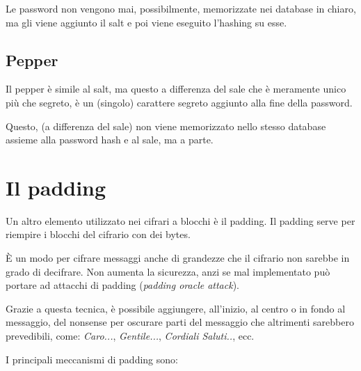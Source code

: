 \textsf{\small Le password non vengono mai, possibilmente, memorizzate nei database in chiaro, ma gli viene aggiunto il salt e poi viene eseguito l'hashing su esse.}

\subsection{Pepper}

\textsf{\small Il pepper è simile al salt, ma questo a differenza del sale che è meramente unico più che segreto, è un (singolo) carattere segreto aggiunto alla fine della password.} %

\textsf{\small Questo, (a differenza del sale) non viene memorizzato nello stesso database assieme alla password hash e al sale, ma a parte.}




\section{Il padding}

\textsf{\small Un altro elemento utilizzato nei cifrari a blocchi è il padding. }
\textsf{\small Il padding serve per riempire i blocchi del cifrario con dei bytes.}

\textsf{\small È un modo per cifrare messaggi anche di grandezze che il cifrario non sarebbe in grado di decifrare.}
\textsf{\small Non aumenta la sicurezza, anzi se mal implementato può portare ad attacchi di padding (\emph{padding oracle attack}).} %

\textsf{\small Grazie a questa tecnica, è possibile aggiungere, all'inizio, al centro o in fondo al messaggio, del nonsense per oscurare parti del messaggio che altrimenti sarebbero prevedibili, come: \emph{Caro...}, \emph{Gentile...}, \emph{Cordiali Saluti..}, ecc.}

\textsf{\small I principali meccanismi di padding sono: }

